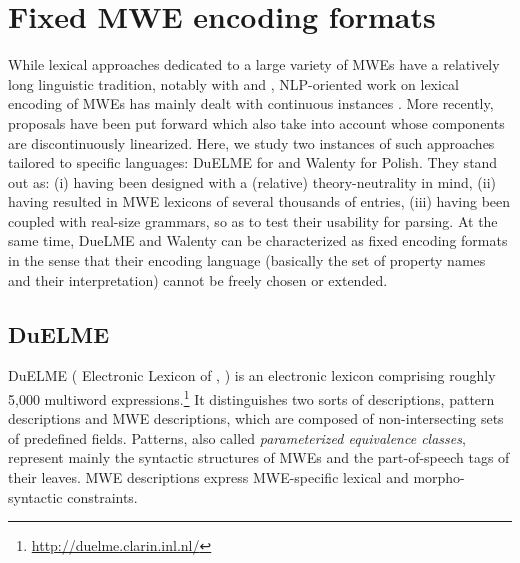 \documentclass[output=paper]{langsci/langscibook}
\begin{document}
%
\section{Fixed MWE encoding formats}
\label{lic:sec:fixed}


While lexical approaches dedicated to a large variety of MWEs have a relatively long linguistic tradition, notably with \cite{gross:86} and \cite{melcuketal:88}, NLP-oriented work on lexical encoding of MWEs has mainly dealt with continuous instances \citep{savary:08}. More recently, proposals have been put forward which also take  into account whose components are discontinuously linearized. Here, we study two instances of such approaches tailored to specific languages: DuELME \citep{gregoire:10} for  and Walenty \citep{prz:etal:14b} for Polish. They stand out as: (i) having been designed with a (relative) theory-neutrality in mind, (ii) having resulted in MWE lexicons of several thousands of entries, (iii) having been coupled with real-size grammars, so as to test their usability for parsing. At the same time, DueLME and Walenty can be characterized as fixed encoding formats in the sense that their encoding language (basically the set of property names and their interpretation) cannot be freely chosen or extended.

\subsection{DuELME}
\label{lic:sec:duelme}

DuELME ( Electronic Lexicon of , \citealt{gregoire:10}) is an electronic lexicon comprising roughly 5,000  multiword expressions.\footnote{\url{http://duelme.clarin.inl.nl/}} It distinguishes two sorts of descriptions, pattern descriptions and MWE descriptions, which are composed of non-intersecting sets of predefined fields. Patterns, also called \textit{parameterized equivalence classes}, represent mainly the syntactic structures of MWEs and the part-of-speech tags of their leaves. MWE descriptions express MWE-specific lexical and morpho-syntactic constraints.
\end{document}
